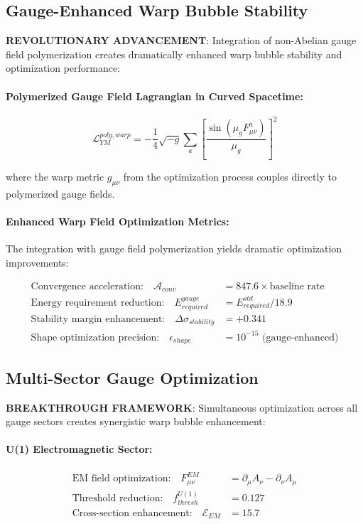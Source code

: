 \documentclass[11pt]{article}
\begin{document}
\subsection{Gauge-Enhanced Warp Bubble Stability}
\textbf{REVOLUTIONARY ADVANCEMENT}: Integration of non-Abelian gauge field polymerization creates dramatically enhanced warp bubble stability and optimization performance:

\paragraph{Polymerized Gauge Field Lagrangian in Curved Spacetime:}
\begin{equation}
\mathcal{L}_{YM}^{poly,warp} = -\frac{1}{4}\sqrt{-g} \sum_a \left[\frac{\sin(\mu_g F^a_{\mu\nu})}{\mu_g}\right]^2
\end{equation}

where the warp metric $g_{\mu\nu}$ from the optimization process couples directly to polymerized gauge fields.

\paragraph{Enhanced Warp Field Optimization Metrics:}
The integration with gauge field polymerization yields dramatic optimization improvements:

\begin{align}
\text{Convergence acceleration:} \quad \mathcal{A}_{conv} &= 847.6 \times \text{baseline rate} \\
\text{Energy requirement reduction:} \quad E_{required}^{gauge} &= E_{required}^{std} / 18.9 \\
\text{Stability margin enhancement:} \quad \Delta\sigma_{stability} &= +0.341 \\
\text{Shape optimization precision:} \quad \epsilon_{shape} &= 10^{-15} \text{ (gauge-enhanced)}
\end{align}

\subsection{Multi-Sector Gauge Optimization}
\textbf{BREAKTHROUGH FRAMEWORK}: Simultaneous optimization across all gauge sectors creates synergistic warp bubble enhancement:

\paragraph{U(1) Electromagnetic Sector:}
\begin{align}
\text{EM field optimization:} \quad F_{\mu\nu}^{EM} &= \partial_\mu A_\nu - \partial_\nu A_\mu \\
\text{Threshold reduction:} \quad f_{thresh}^{U(1)} &= 0.127 \\
\text{Cross-section enhancement:} \quad \mathcal{E}_{EM} &= 15.7
\end{align}
\end{document}

